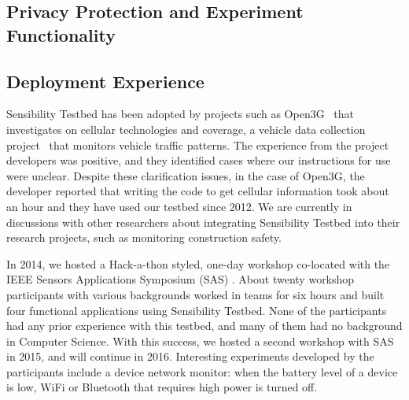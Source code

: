 \subsection{Privacy Protection and Experiment Functionality}



%
%

\subsection{Deployment Experience}\label{sec-deployment}



Sensibility Testbed has been adopted by projects such as 
Open3G~\cite{open3g} that investigates on cellular technologies 
and coverage, a vehicle data collection project~\cite{reininger2015first} 
that monitors vehicle traffic patterns. The experience from the 
project developers was positive, and they identified cases where our 
instructions for use were unclear. Despite these clarification issues, in 
the case of Open3G, the developer reported that writing the code to
get cellular information took about an hour and they have used our
testbed since 2012. We are currently in discussions with other 
researchers about integrating Sensibility Testbed into their research
projects, such as monitoring construction safety.

In 2014, we hosted a Hack-a-thon styled, one-day workshop co-located with 
the IEEE Sensors Applications Symposium (SAS) \cite{sas}. About twenty 
workshop participants with various backgrounds worked in teams 
for six hours and built four functional applications using Sensibility 
Testbed. None of the participants had any prior experience with 
this testbed, and many of them had no background in Computer
Science. With this success, we hosted a second workshop with 
SAS in 2015, and will continue in 2016. Interesting experiments 
developed by the participants include a device network monitor: 
when the battery level of a device is low, WiFi or Bluetooth that 
requires high power is turned off.

